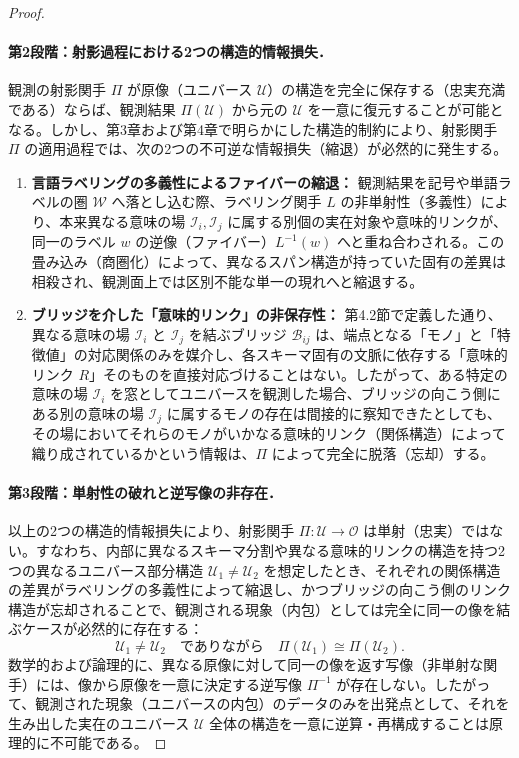 \documentclass[11pt,a4paper,luatex]{jlreq}
\theoremstyle{definition}
\theoremstyle{plain}
\begin{document}
\begin{proof}
\paragraph{第2段階：射影過程における2つの構造的情報損失．}
観測の射影関手 $\Pi$ が原像（ユニバース $\mathcal{U}$）の構造を完全に保存する（忠実充満である）ならば、観測結果 $\Pi(\mathcal{U})$ から元の $\mathcal{U}$ を一意に復元することが可能となる。しかし、第3章および第4章で明らかにした構造的制約により、射影関手 $\Pi$ の適用過程では、次の2つの不可逆な情報損失（縮退）が必然的に発生する。
\begin{enumerate}
    \item \textbf{言語ラベリングの多義性によるファイバーの縮退：} 観測結果を記号や単語ラベルの圏 $\mathcal{W}$ へ落とし込む際、ラベリング関手 $L$ の非単射性（多義性）により、本来異なる意味の場 $\mathcal{I}_i, \mathcal{I}_j$ に属する別個の実在対象や意味的リンクが、同一のラベル $w$ の逆像（ファイバー）$L^{-1}(w)$ へと重ね合わされる。この畳み込み（商圏化）によって、異なるスパン構造が持っていた固有の差異は相殺され、観測面上では区別不能な単一の現れへと縮退する。
    \item \textbf{ブリッジを介した「意味的リンク」の非保存性：} 第4.2節で定義した通り、異なる意味の場 $\mathcal{I}_{i}$ と $\mathcal{I}_{j}$ を結ぶブリッジ $\mathcal{B}_{ij}$ は、端点となる「モノ」と「特徴値」の対応関係のみを媒介し、各スキーマ固有の文脈に依存する「意味的リンク $R$」そのものを直接対応づけることはない。したがって、ある特定の意味の場 $\mathcal{I}_{i}$ を窓としてユニバースを観測した場合、ブリッジの向こう側にある別の意味の場 $\mathcal{I}_{j}$ に属するモノの存在は間接的に察知できたとしても、その場においてそれらのモノがいかなる意味的リンク（関係構造）によって織り成されているかという情報は、$\Pi$ によって完全に脱落（忘却）する。
\end{enumerate}

\paragraph{第3段階：単射性の破れと逆写像の非存在．}
以上の2つの構造的情報損失により、射影関手 $\Pi: \mathcal{U} \to \mathcal{O}$ は単射（忠実）ではない。すなわち、内部に異なるスキーマ分割や異なる意味的リンクの構造を持つ2つの異なるユニバース部分構造 $\mathcal{U}_1 \neq \mathcal{U}_2$ を想定したとき、それぞれの関係構造の差異がラベリングの多義性によって縮退し、かつブリッジの向こう側のリンク構造が忘却されることで、観測される現象（内包）としては完全に同一の像を結ぶケースが必然的に存在する：
\begin{equation*}
\mathcal{U}_{1} \neq \mathcal{U}_{2} \quad \text{でありながら} \quad \Pi(\mathcal{U}_{1}) \cong \Pi(\mathcal{U}_{2}).
\end{equation*}
数学的および論理的に、異なる原像に対して同一の像を返す写像（非単射な関手）には、像から原像を一意に決定する逆写像 $\Pi^{-1}$ が存在しない。したがって、観測された現象（ユニバースの内包）のデータのみを出発点として、それを生み出した実在のユニバース $\mathcal{U}$ 全体の構造を一意に逆算・再構成することは原理的に不可能である。
\end{proof}
\end{document}
